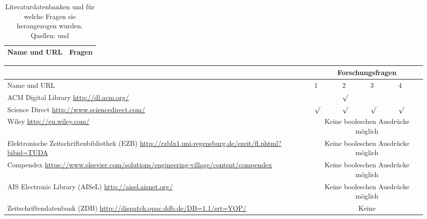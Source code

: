  \begin{table}[bh]
\centering
\begin{tabular}{|p{}|p{}|}
	\hline
	\textbf{Name und URL} & \textbf{Fragen}\\
	\hline

\end{tabular}
\caption{Literaturdatenbanken und für welche Fragen sie herangezogen wurden. 
Quellen: \cite{exploring_the_factors} und \cite{formatvorlage}}
\label{tab:literaturdatenbanken}
\end{table}

\begin{tabular}{|p{}|p{}|p{}|p{
}|p{}|}
\hline
   & 
\multicolumn{4}{c|}{Forschungsfragen}\\
\hline
Name und URL & 1 & 2 & 3 & 4\\
	ACM Digital Library \newline \url{http://dl.acm.org/} & & $\surd$ & & \\
	\hline
	Science Direct \newline \url{http://www.sciencedirect.com/} & $\surd$& 
$\surd$& $\surd$& $\surd$ \\
	\hline
	Wiley \newline \url{http://eu.wiley.com/} & \multicolumn{4}{c|}{Keine 
booleschen Ausdrücke möglich} \\
	\hline
	Elektronische Zeitschriftenbibliothek (EZB)\newline
\url{http://rzblx1.uni-regensburg.de/ezeit/fl.phtml?bibid=TUDA} & 
\multicolumn{4}{c|}{Keine 
booleschen Ausdrücke möglich} \\
	\hline
	Compendex \newline
\url{https://www.elsevier.com/solutions/engineering-village/content/compendex} 
& \multicolumn{4}{c|}{Keine 
booleschen Ausdrücke möglich} \\
	\hline
	AIS Electronic Library (AISeL) \newline \url{http://aisel.aisnet.org/} & 
\multicolumn{4}{c|}{Keine 
booleschen Ausdrücke möglich} \\
	\hline
	Zeitschriftendatenbank (ZDB) \newline 
\url{http://dispatch.opac.ddb.de/DB=1.1/srt=YOP/} & \multicolumn{4}{c|}{Keine 
}
\end{tabular}
